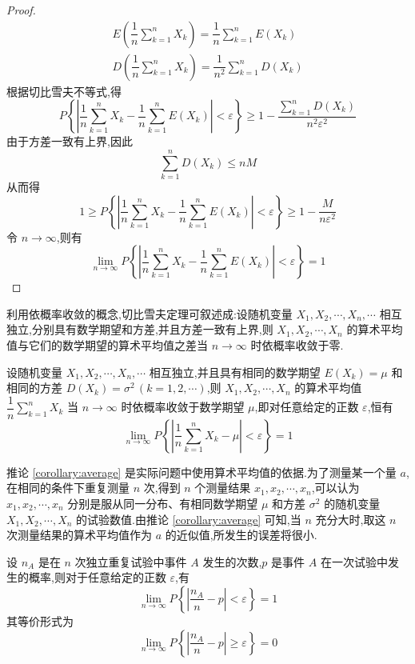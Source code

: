 \begin{proof}
    $$
    \begin{gathered}
        E(\dfrac{1}{n} \sum_{k=1}^n X_k) = \dfrac{1}{n} \sum_{k=1}^n E(X_k) \\
        D(\dfrac{1}{n} \sum_{k=1}^n X_k) = \dfrac{1}{n^2} \sum_{k=1}^n D(X_k)
    \end{gathered}
    $$
    根据切比雪夫不等式,得
    $$
    P \left\{ \left| \dfrac{1}{n} \sum_{k=1}^n X_k - \dfrac{1}{n} \sum_{k=1}^n E(X_k) \right| < \varepsilon \right\} \geqslant 1 - \dfrac{\displaystyle\sum_{k=1}^n D(X_k)}{n^2 \varepsilon^2}
    $$
    由于方差一致有上界,因此
    $$
    \sum_{k=1}^n D(X_k) \leqslant nM
    $$
    从而得
    $$
    1 \geqslant P \left\{ \left| \dfrac{1}{n} \sum_{k=1}^n X_k - \dfrac{1}{n} \sum_{k=1}^n E(X_k) \right| < \varepsilon \right\} \geqslant 1 - \dfrac{M}{n \varepsilon^2}
    $$
    令 $n \to \infty$,则有
    $$
    \lim_{n \to \infty} P \left\{ \left| \dfrac{1}{n} \sum_{k=1}^n X_k - \dfrac{1}{n} \sum_{k=1}^n E(X_k) \right| < \varepsilon \right\} = 1
    $$
\end{proof}

利用依概率收敛的概念,切比雪夫定理可叙述成:设随机变量 $X_1, X_2, \cdots, X_n, \cdots$ 相互独立,分别具有数学期望和方差,并且方差一致有上界,则 $X_1, X_2, \cdots, X_n$ 的算术平均值与它们的数学期望的算术平均值之差当 $n \to \infty$ 时依概率收敛于零.

\begin{corollary} \label{corollary:average}
    设随机变量 $X_1, X_2, \cdots, X_n, \cdots$ 相互独立,并且具有相同的数学期望 $E(X_k) = \mu$ 和相同的方差 $D(X_k) = \sigma^2 \, (k=1,2,\cdots)$,则 $X_1, X_2, \cdots, X_n$ 的算术平均值 $\dfrac{1}{n} \displaystyle\sum_{k=1}^n X_k$ 当 $n \to \infty$ 时依概率收敛于数学期望 $\mu$,即对任意给定的正数 $\varepsilon$,恒有
    $$
    \lim_{n \to \infty} P \left\{ \left| \dfrac{1}{n} \sum_{k=1}^n X_k - \mu \right| < \varepsilon \right\} = 1
    $$
\end{corollary}

推论 \ref{corollary:average} 是实际问题中使用算术平均值的依据.为了测量某一个量 $a$,在相同的条件下重复测量 $n$ 次,得到 $n$ 个测量结果 $x_1,x_2,\cdots,x_n$,可以认为 $x_1,x_2,\cdots,x_n$ 分别是服从同一分布、有相同数学期望 $\mu$ 和方差 $\sigma^2$ 的随机变量 $X_1,X_2,\cdots,X_n$ 的试验数值.由推论 \ref{corollary:average} 可知,当 $n$ 充分大时,取这 $n$ 次测量结果的算术平均值作为 $a$ 的近似值,所发生的误差将很小.

\begin{theorem}[][伯努利定理]
    设 $n_A$ 是在 $n$ 次独立重复试验中事件 $A$ 发生的次数,$p$ 是事件 $A$ 在一次试验中发生的概率,则对于任意给定的正数 $\varepsilon$,有
    $$
    \lim_{n \to \infty} P \left\{ \left| \dfrac{n_A}{n} - p \right| < \varepsilon \right\} = 1
    $$
    其等价形式为
    $$
    \lim_{n \to \infty} P \left\{ \left| \dfrac{n_A}{n} - p \right| \geqslant \varepsilon \right\} = 0
    $$
\end{theorem}

